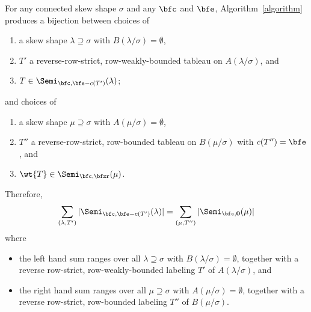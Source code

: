 \begin{prop} \label{p:main}
For any connected skew shape $\sigma$ and any $\bfc$ and $\bfe$, Algorithm~\ref{algorithm} produces a bijection between choices of 
\begin{enumerate}
\item a skew shape $\lambda \supseteq \sigma$ with $B(\lambda/\sigma)=\emptyset$,
\item $T'$ a reverse-row-strict, row-weakly-bounded tableau on $A(\lambda/\sigma)$, and
\item $T\in \Semi_{\bfc,\bfe-c(T')}(\lambda)$;
\end{enumerate}

\noindent
and choices of
\begin{enumerate}
\item a skew shape $\mu\supseteq \sigma$ with $A(\mu/\sigma)=\emptyset$,
\item $T''$ a reverse-row-strict, row-bounded tableau on $B(\mu/\sigma)$ with $c(T'')=\bfe$, and
\item $\wt{T} \in \Semi_{\bfc,\bfzr}(\mu)$.
\end{enumerate}
Therefore, 
\begin{equation}\label{eq:ss}
\sum_{(\lambda, T')} |\Semi_{\bfc, \bfe-c(T')}(\lambda)| = \sum_{(\mu,T'')} |\Semi_{\bfc, \mathbf{0}}(\mu)|
\end{equation}
where
\begin{itemize}
\item the left hand sum ranges over all $\lambda\supseteq \sigma$ with $B(\lambda/\sigma)=\emptyset$, together with a reverse row-strict, row-weakly-bounded labeling $T'$ of $A(\lambda/\sigma)$, and
\item the right hand sum ranges over all $\mu\supseteq \sigma$ with $A(\mu/\sigma) = \emptyset$, together with a reverse row-strict, row-bounded labeling $T''$ of $B(\mu/\sigma)$.
\end{itemize}
\end{prop}

